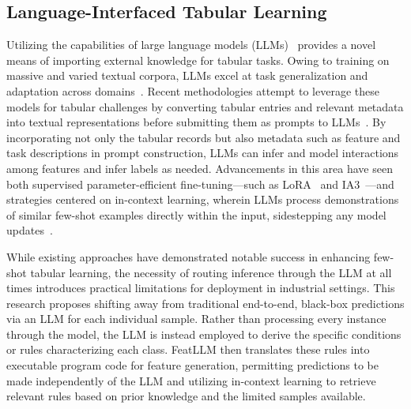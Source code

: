 \subsection{Language-Interfaced Tabular Learning}

Utilizing the capabilities of large language models (LLMs)~\cite{anil2023palm,openai2023gpt4} provides a novel means of importing external knowledge for tabular tasks. Owing to training on massive and varied textual corpora, LLMs excel at task generalization and adaptation across domains~\cite{brown2020language}. Recent methodologies attempt to leverage these models for tabular challenges by converting tabular entries and relevant metadata into textual representations before submitting them as prompts to LLMs~\cite{dinh2022lift,hegselmann2023tabllm,wang2023anypredict}. By incorporating not only the tabular records but also metadata such as feature and task descriptions in prompt construction, LLMs can infer and model interactions among features and infer labels as needed. Advancements in this area have seen both supervised parameter-efficient fine-tuning—such as LoRA~\cite{hu2021lora} and IA3~\cite{liu2022few}—and strategies centered on in-context learning, wherein LLMs process demonstrations of similar few-shot examples directly within the input, sidestepping any model updates~\cite{dinh2022lift,hegselmann2023tabllm,nam2023semi,slack2023tablet}.

While existing approaches have demonstrated notable success in enhancing few-shot tabular learning, the necessity of routing inference through the LLM at all times introduces practical limitations for deployment in industrial settings. This research proposes shifting away from traditional end-to-end, black-box predictions via an LLM for each individual sample. Rather than processing every instance through the model, the LLM is instead employed to derive the specific conditions or rules characterizing each class. \textsf{FeatLLM} then translates these rules into executable program code for feature generation, permitting predictions to be made independently of the LLM and utilizing in-context learning to retrieve relevant rules based on prior knowledge and the limited samples available.

